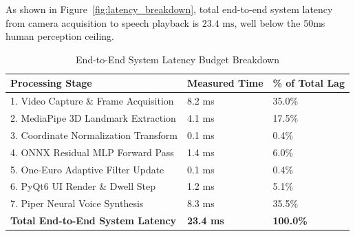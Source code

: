 As shown in Figure~\ref{fig:latency_breakdown}, total end-to-end system latency from camera acquisition to speech playback is \textbf{$23.4\text{ ms}$}, well below the 50ms human perception ceiling.

\begin{table}[htbp]
\centering
\caption{End-to-End System Latency Budget Breakdown}
\label{tab:latency_budget}
\begin{tabular}{@{}lll@{}}
\toprule
\textbf{Processing Stage} & \textbf{Measured Time} & \textbf{\% of Total Lag} \\
\midrule
1. Video Capture \& Frame Acquisition & 8.2 ms & 35.0\% \\
2. MediaPipe 3D Landmark Extraction & 4.1 ms & 17.5\% \\
3. Coordinate Normalization Transform & 0.1 ms & 0.4\% \\
4. ONNX Residual MLP Forward Pass & 1.4 ms & 6.0\% \\
5. One-Euro Adaptive Filter Update & 0.1 ms & 0.4\% \\
6. PyQt6 UI Render \& Dwell Step & 1.2 ms & 5.1\% \\
7. Piper Neural Voice Synthesis & 8.3 ms & 35.5\% \\
\midrule
\textbf{Total End-to-End System Latency} & \textbf{23.4 ms} & \textbf{100.0\%} \\
\bottomrule
\end{tabular}
\end{table}

